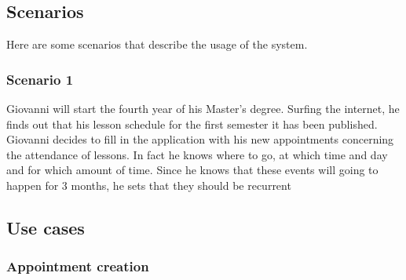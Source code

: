 \subsection{Scenarios}
Here are some scenarios that describe the usage of the system.
\subsubsection{Scenario 1} \label{scenario:1}
Giovanni will start the fourth year of his Master's degree. Surfing the internet, he finds out that his lesson schedule for the first semester it has been published. Giovanni decides to fill in the application with his new appointments concerning the attendance of lessons. In fact he knows where to go, at which time and day and for which amount of time. Since he knows that these events will going to happen for 3 months, he sets that they should be recurrent

\subsection{Use cases}


\subsubsection{Appointment creation} \label{usecase:appcreation}

